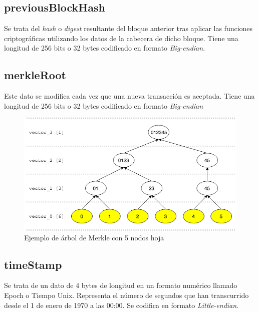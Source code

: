 \documentclass{article}
\begin{document}
    \subsection{previousBlockHash}
    Se trata del \textit{hash} o \textit{digest} resultante del bloque anterior tras aplicar las funciones criptográficas utilizando los datos de la cabecera de dicho bloque. Tiene una longitud de 256 bits o 32 bytes codificado en formato \textit{Big-endian}.
    
    \subsection{merkleRoot}
    Este dato se modifica cada vez que una nueva transacción es aceptada. Tiene una longitud de 256 bits o 32 bytes codificado en formato \textit{Big-endian}
    
    \begin{figure}[H]
    \centering
        \includegraphics[scale=0.55]{img/Merkle_tree_05_leaves_nodes}
        \caption{Ejemplo de árbol de Merkle con 5 nodos hoja}
    \end{figure}
    
    \subsection{timeStamp}
    Se trata de un dato de 4 bytes de longitud en un formato numérico llamado Epoch o Tiempo Unix. Representa el número de segundos que han transcurrido desde el 1 de enero de 1970 a las 00:00. Se codifica en formato \textit{Little-endian}.
    
\end{document}
